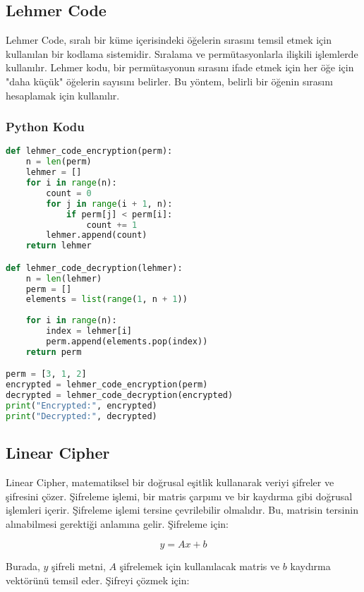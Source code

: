\newpage

\subsection{Lehmer Code}

Lehmer Code, sıralı bir küme içerisindeki öğelerin sırasını temsil etmek için kullanılan bir kodlama sistemidir. Sıralama ve permütasyonlarla ilişkili işlemlerde kullanılır. Lehmer kodu, bir permütasyonun sırasını ifade etmek için her öğe için "daha küçük" öğelerin sayısını belirler. Bu yöntem, belirli bir öğenin sırasını hesaplamak için kullanılır.

\subsubsection{Python Kodu}

\begin{lstlisting}[language=Python]
def lehmer_code_encryption(perm):
    n = len(perm)
    lehmer = []
    for i in range(n):
        count = 0
        for j in range(i + 1, n):
            if perm[j] < perm[i]:
                count += 1
        lehmer.append(count)
    return lehmer

def lehmer_code_decryption(lehmer):
    n = len(lehmer)
    perm = []
    elements = list(range(1, n + 1))
    
    for i in range(n):
        index = lehmer[i]
        perm.append(elements.pop(index))
    return perm

perm = [3, 1, 2]
encrypted = lehmer_code_encryption(perm)
decrypted = lehmer_code_decryption(encrypted)
print("Encrypted:", encrypted)
print("Decrypted:", decrypted)
\end{lstlisting}

\newpage

\subsection{Linear Cipher}

Linear Cipher, matematiksel bir doğrusal eşitlik kullanarak veriyi şifreler ve şifresini çözer. Şifreleme işlemi, bir matris çarpımı ve bir kaydırma gibi doğrusal işlemleri içerir. Şifreleme işlemi tersine çevrilebilir olmalıdır. Bu, matrisin tersinin alınabilmesi gerektiği anlamına gelir. Şifreleme için:

\[ y = Ax + b \]

Burada, $y$ şifreli metni, $A$ şifrelemek için kullanılacak matris ve $b$ kaydırma vektörünü temsil eder. Şifreyi çözmek için:

